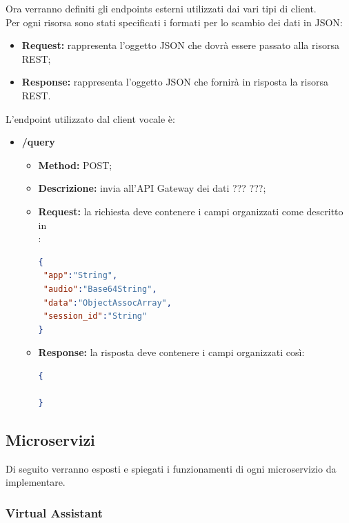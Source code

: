 	Ora verranno definiti gli endpoints esterni utilizzati dai vari tipi di client.\\
	Per ogni risorsa sono stati specificati i formati per lo scambio dei dati in JSON: 
	\begin{itemize}
		\item \textbf{Request:} rappresenta l’oggetto JSON che dovrà essere passato alla risorsa REST;
		\item \textbf{Response:} rappresenta l’oggetto JSON che fornirà in risposta la risorsa REST.
	\end{itemize}
	L'endpoint utilizzato dal client vocale è: 
	\begin{itemize}
		\item \textbf{/query}\\
		\begin{itemize}
			\item \textbf{Method:} POST;
			\item \textbf{Descrizione:} invia all'API Gateway dei dati ??? ???;
			\item \textbf{Request:} la richiesta deve contenere i campi organizzati come descritto in \\:
\begin{lstlisting}[language=json,firstnumber=1]
{
 "app":"String",
 "audio":"Base64String",
 "data":"ObjectAssocArray",
 "session_id":"String"	
}
\end{lstlisting}
			\item \textbf{Response:} la risposta deve contenere i campi organizzati così:
\begin{lstlisting}[language=json,firstnumber=1]
{
			
}
\end{lstlisting}
		\end{itemize}
	\end{itemize}

\subsection{Microservizi}
Di seguito verranno esposti e spiegati i funzionamenti di ogni microservizio da implementare.
\subsubsection{Virtual Assistant}
